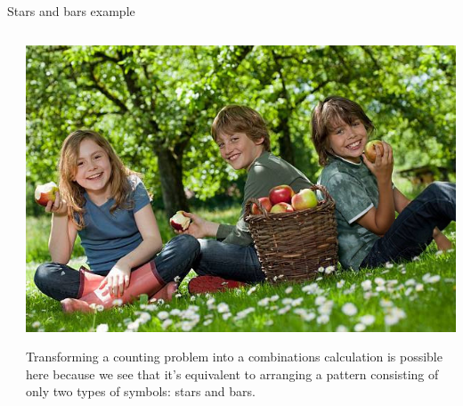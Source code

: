 \documentclass[9pt,aspectratio=169]{beamer}
\begin{document}
\begin{frame}{Stars and bars example}
\begin{columns}[T]
\begin{column}{0.5\textwidth}
    \end{column}
    \begin{column}{0.5\textwidth}
      \begin{center}
        \vspace*{-1\baselineskip}
        \includegraphics[width=\textwidth]{08 - Inclusion Exclusion Principle/apples.jpg}
      \end{center}
      Transforming a counting problem into a combinations calculation is possible here because we see that it’s equivalent to arranging a pattern consisting of only two types of symbols: stars and bars.
    \end{column}
  \end{columns}
\end{frame}
\end{document}
